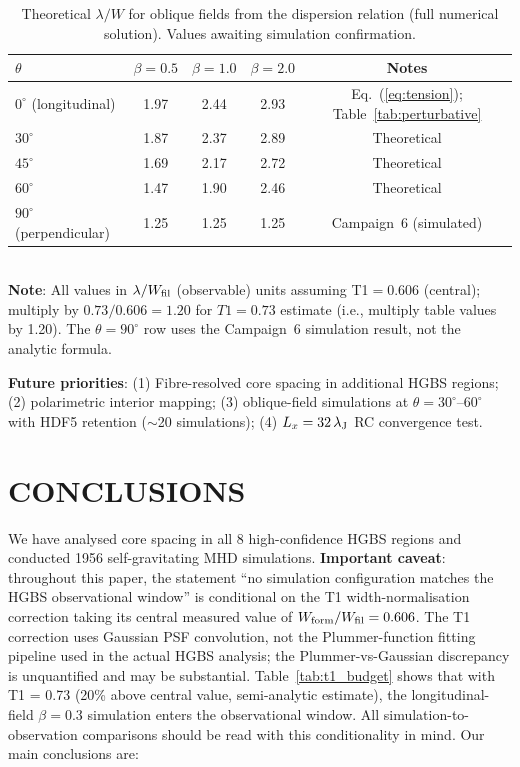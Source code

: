 \documentclass[twoside,twocolumn]{mnras}
\begin{document}
\begin{table}
\caption{Theoretical $\lambda/W$ for oblique fields from the \citet{Nakamura1993} dispersion relation (full numerical solution). Values awaiting simulation confirmation.}
\label{tab:oblique_theory}
\small
\begin{tabular}{lcccc}
\toprule
$\theta$ & $\beta=0.5$ & $\beta=1.0$ & $\beta=2.0$ & Notes \\
\midrule
$0^\circ$ (longitudinal) & 1.97 & 2.44 & 2.93 & Eq.~(\ref{eq:tension}); Table~\ref{tab:perturbative} \\
$30^\circ$ & 1.87 & 2.37 & 2.89 & Theoretical \\
$45^\circ$ & 1.69 & 2.17 & 2.72 & Theoretical \\
$60^\circ$ & 1.47 & 1.90 & 2.46 & Theoretical \\
$90^\circ$ (perpendicular) & 1.25 & 1.25 & 1.25 & Campaign~6 (simulated) \\
\bottomrule
\end{tabular}
\\ \footnotesize \textbf{Note}: All values in $\lambda/W_{\rm fil}$ (observable) units assuming T1$=0.606$ (central); multiply by $0.73/0.606 = 1.20$ for $T1=0.73$ estimate (i.e., multiply table values by 1.20). The $\theta=90^\circ$ row uses the Campaign~6 simulation result, not the analytic formula.
\end{table}

\textbf{Future priorities}: (1) Fibre-resolved core spacing in additional HGBS regions; (2) polarimetric interior mapping; (3) oblique-field simulations at $\theta = 30^\circ$--$60^\circ$ with HDF5 retention ($\sim$20 simulations); (4) $L_x = 32\,\lambda_{\rm J}$ RC convergence test.

\section{CONCLUSIONS}

We have analysed core spacing in all 8 high-confidence HGBS regions and conducted
1956 self-gravitating MHD simulations. \textbf{Important caveat}: throughout this
paper, the statement ``no simulation configuration matches the HGBS observational
window'' is conditional on the T1 width-normalisation correction taking its central
measured value of $W_{\rm form}/W_{\rm fil} = 0.606$. The T1 correction uses Gaussian
PSF convolution, not the Plummer-function fitting pipeline used in the actual HGBS
analysis; the Plummer-vs-Gaussian discrepancy is unquantified and may be substantial.
Table~\ref{tab:t1_budget} shows that with T1 = 0.73 (20\% above central value, semi-analytic estimate), the longitudinal-field $\beta = 0.3$ simulation enters the observational window. All
simulation-to-observation comparisons should be read with this conditionality in mind.
Our main conclusions are:
\end{document}
